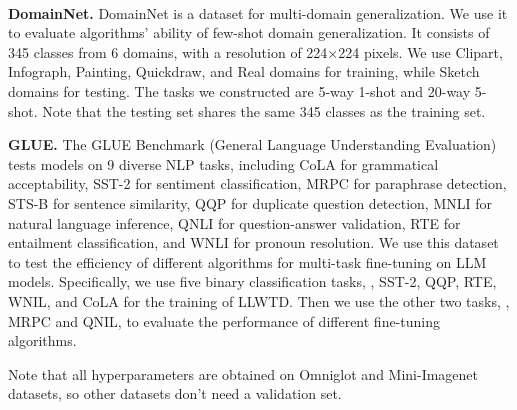 \\
\par
\noindent\textbf{DomainNet.}
DomainNet is a dataset for multi-domain generalization. We use it to evaluate algorithms' ability of few-shot domain generalization. It consists of 345 classes from 6 domains, with a resolution of 224$\times$224 pixels. We use Clipart, Infograph, Painting, Quickdraw, and Real domains for training, while Sketch domains for testing. The tasks we constructed are 5-way 1-shot and 20-way 5-shot. Note that the testing set shares the same 345 classes as the training set.
\\
\par
\noindent\textbf{GLUE.}
The GLUE Benchmark (General Language Understanding Evaluation) tests models on 9 diverse NLP tasks, including CoLA for grammatical acceptability, SST-2 for sentiment classification, MRPC for paraphrase detection, STS-B for sentence similarity, QQP for duplicate question detection, MNLI for natural language inference, QNLI for question-answer validation, RTE for entailment classification, and WNLI for pronoun resolution. We use this dataset to test the efficiency of different algorithms for multi-task fine-tuning on LLM models. Specifically, we use five binary classification tasks, \ie, SST-2, QQP, RTE, WNIL, and CoLA for the training of LLWTD. Then we use the other two tasks, \ie, MRPC and QNIL, to evaluate the performance of different fine-tuning algorithms.
\\
\par
Note that all hyperparameters are obtained on Omniglot and Mini-Imagenet datasets, so other datasets don't need a validation set.

